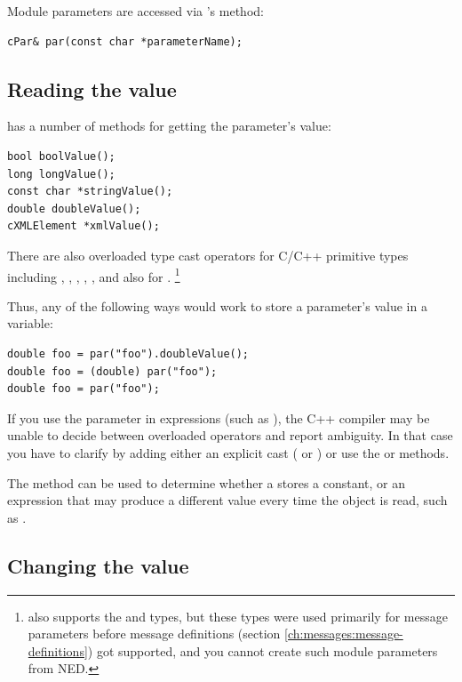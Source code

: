 Module parameters are accessed via 's  method:

\begin{verbatim}
cPar& par(const char *parameterName);
\end{verbatim}

\subsection{Reading the value}

 has a number of methods for getting the parameter's value:

\begin{verbatim}
bool boolValue();
long longValue();
const char *stringValue();
double doubleValue();
cXMLElement *xmlValue();
\end{verbatim}

There are also overloaded type cast operators for C/C++ primitive types
including , , , , ,
and also for .
    \footnote{ also supports the  and  types,
    but these types were used primarily for message parameters before
    message definitions (section \ref{ch:messages:message-definitions})
    got supported, and you cannot create such module parameters from NED.}

Thus, any of the following ways would work to store a parameter's value in
a variable:

\begin{verbatim}
double foo = par("foo").doubleValue();
double foo = (double) par("foo");
double foo = par("foo");
\end{verbatim}

If you use the  parameter in expressions (such as
), the C++ compiler may be unable to decide
between overloaded operators and report ambiguity. In that case
you have to clarify by adding either an explicit cast
( or ) or use
the  or  methods.

The  method can be used to determine whether a
 stores a constant, or an expression that may produce a different
value every time the object is read, such as .


\subsection{Changing the value}

